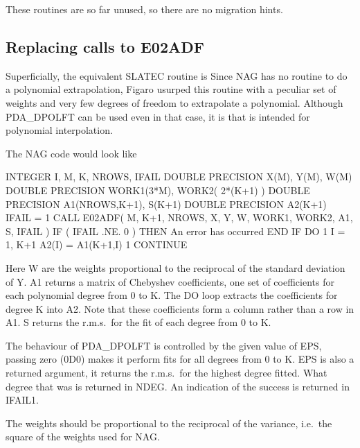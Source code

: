 \documentclass[11pt,twoside,nolof]{starlink}
\begin{document}
   These routines are so far unused, so there are no migration hints.


\subsection{\label{m_e02adf}Replacing calls to E02ADF}

   Superficially, the equivalent SLATEC routine is
   Since NAG
   has no routine to do a polynomial extrapolation,
   Figaro usurped this routine with a peculiar set of weights
   and very few degrees of freedom to extrapolate a polynomial. Although
   PDA\_DPOLFT can be used even in that case, it is
   that is
   intended for polynomial interpolation.

   The NAG code would look like

\begin{terminalv}
      INTEGER I, M, K, NROWS, IFAIL
      DOUBLE PRECISION X(M), Y(M), W(M)
      DOUBLE PRECISION WORK1(3*M), WORK2( 2*(K+1) )
      DOUBLE PRECISION A1(NROWS,K+1), S(K+1)
      DOUBLE PRECISION A2(K+1)
      IFAIL = 1
      CALL E02ADF( M, K+1, NROWS, X, Y, W, WORK1, WORK2, A1, S, IFAIL )
      IF ( IFAIL .NE. 0 ) THEN
         An error has occurred
      END IF
      DO 1 I = 1, K+1
         A2(I) = A1(K+1,I)
    1 CONTINUE
\end{terminalv}

   Here W are the weights proportional to the reciprocal of the standard
   deviation of Y. A1 returns a matrix of Chebyshev coefficients, one
   set of coefficients for each polynomial degree from 0 to K. The DO
   loop extracts the coefficients for degree K into A2. Note that these
   coefficients form a column rather than a row in A1. S returns the
   r.m.s.\ for the fit of each degree from 0 to K.

   The behaviour of PDA\_DPOLFT is controlled by the given value of EPS,
   passing zero (0D0) makes it perform fits for all degrees from 0 to K.
   EPS is also a returned argument, it returns the r.m.s.\ for
   the highest degree fitted. What degree that was is returned in NDEG.
   An indication of the success is returned in IFAIL1.

   The weights should be proportional to the reciprocal of the variance,
   i.e.\ the square of the weights used for NAG.
\end{document}
